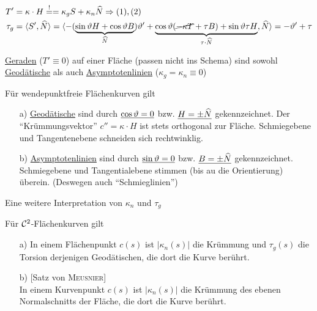 \begin{beweis}
 \begin{align*}
  T' &= \kappa \cdot H \stackrel{!}{=} = \kappa_g S + \kappa_n \widehat N \Rightarrow (1), (2) \\
  \tau_g &= \langle S', \widehat N \rangle = \langle -(\underbrace{\sin \vartheta H + \cos \vartheta B}_{\widehat N}) \vartheta' + \underbrace{\cos \vartheta (\cancel{-\kappa T} + \tau B) + \sin \vartheta \tau H}_{\tau \cdot \widehat N}, \widehat N \rangle = -\vartheta' + \tau
 \end{align*}
\end{beweis}

\begin{bemerkung}
 \uline{Geraden} (\(T' \equiv 0\)) auf einer Fläche (passen nicht ins Schema) sind sowohl \uline{Geodätische} als auch \uline{Asymptotenlinien} (\(\kappa_g = \kappa_n \equiv 0\))
\end{bemerkung}

\begin{folgerung}
 Für wendepunktfreie Flächenkurven gilt
 \begin{enumerate}
  \item[a)] \uline{Geodätische} sind durch \(\uline{\cos \vartheta = 0}\) bzw. \(\uline{H = \pm \widehat N}\) gekennzeichnet. Der ``Krümmungsvektor'' \(c'' = \kappa \cdot H\) ist stets orthogonal zur Fläche. Schmiegebene und Tangentenebene schneiden sich rechtwinklig.
  \item[b)] \uline{Asymptotenlinien} sind durch \(\uline{\sin \vartheta = 0}\) bzw. \(\uline{B = \pm \widehat N}\) gekennzeichnet. Schmiegebene und Tangentialebene stimmen (bis au die Orientierung) überein. (Deswegen auch ``Schmieglinien'')
 \end{enumerate}
\end{folgerung}

Eine weitere Interpretation von \(\kappa_n\) und \(\tau_g\)

\begin{satz}\label{satz244}
 Für \(\mathcal{C}^2\)-Flächenkurven gilt
 \begin{enumerate}
  \item[a)] In einem Flächenpunkt \(c(s)\) ist \(|\kappa_n(s)|\) die Krümmung und \(\tau_g(s)\) die Torsion derjenigen Geodätischen, die dort die Kurve berührt.
  \item[b)] [Satz von \textsc{Meusnier}] \\
  In einem Kurvenpunkt \(c(s)\) ist \(|\kappa_n(s)|\) die Krümmung des ebenen Normalschnitts der Fläche, die dort die Kurve berührt.
 \end{enumerate}
\end{satz}

